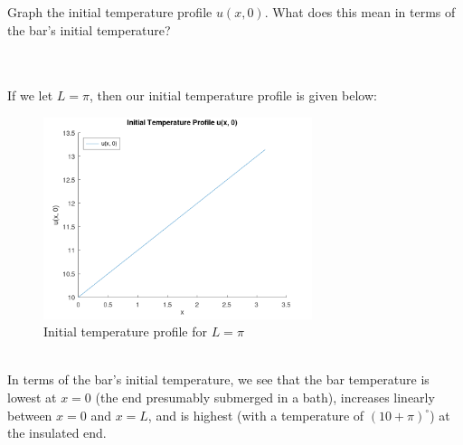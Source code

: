 Graph the initial temperature profile $u(x, 0)$. What does this mean in terms of the bar's initial temperature?

\begin{solution}\ \\\\
    If we let $L = \pi$, then our initial temperature profile is given below:

    \begin{figure}[h]
        \centering
        \includegraphics[width=0.7\textwidth]{problem1b_initial_temperature_profile.png}
        \caption{Initial temperature profile for $L = \pi$}
    \end{figure}
    \ \\

    In terms of the bar's initial temperature, we see that the bar temperature is lowest at $x = 0$ (the end presumably 
    submerged in a bath), increases linearly between $x = 0$ and $x = L$, and is highest (with a temperature of 
    $(10 + \pi)^{\circ}$) at the insulated end.
\end{solution}